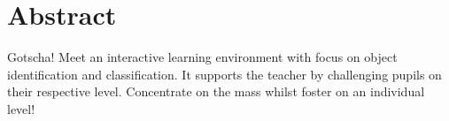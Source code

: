 
\chapter*{Abstract}

Gotscha! Meet an interactive learning environment with focus on object
identification and classification. It supports the teacher by challenging pupils
on their respective level. Concentrate on the mass whilst foster on an
individual level!
